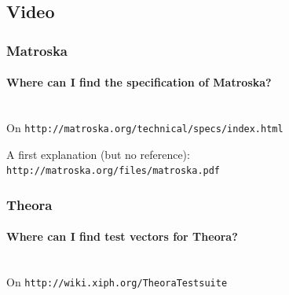 \documentclass[10pt]{scrbook}
\begin{document}
\subsection{Video}

\subsubsection{Matroska}

\paragraph{Where can I find the specification of Matroska?} ~ \\
On \verb|http://matroska.org/technical/specs/index.html|

A first explanation (but no reference): \verb|http://matroska.org/files/matroska.pdf|

\subsubsection{Theora}

\paragraph{Where can I find test vectors for Theora?} ~ \\
On \verb|http://wiki.xiph.org/TheoraTestsuite|
\end{document}
